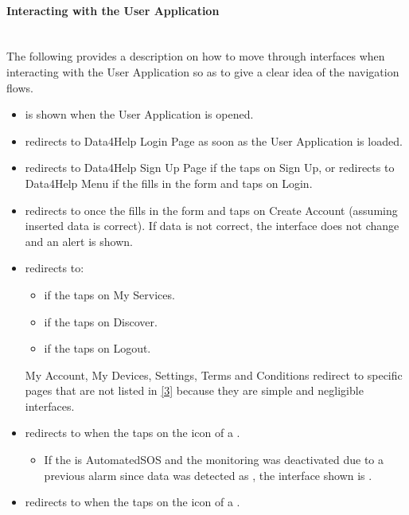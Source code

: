 \documentclass[../DD.tex]{subfiles}
\begin{document}
	\paragraph{Interacting with the User Application}\mbox{}\\
	\indent The following provides a description on how to move through interfaces when interacting with the User Application so as to give a clear idea of the navigation flows.
	\begin{itemize}
		\item {} is shown when the User Application is opened.
		\item {} redirects to Data4Help Login Page as soon as the User Application is loaded.
		\item {} redirects to Data4Help Sign Up Page if the  taps on Sign Up, or redirects to Data4Help Menu if the  fills in the form and taps on Login.
		\item {}redirects to  once the  fills in the form and taps on Create Account (assuming inserted data is correct). If data is not correct, the interface does not change and an alert is shown.
		\item {} redirects to:
			\begin{itemize}
				\item {} if the  taps on My Services.
				\item {} if the  taps on Discover.
				\item {} if the  taps on Logout.				
			\end{itemize}
			My Account, My Devices, Settings, Terms and Conditions redirect to specific pages that are not listed in \hyperref[ref:3]{[3]} because they are simple and negligible interfaces. 
		\item {} redirects to  when the  taps on the icon of a .
			\begin{itemize}
				\item If the  is AutomatedSOS and the monitoring was deactivated due to a previous alarm since data was detected as , the interface shown is .
			\end{itemize}
		\item {} redirects to  when the  taps on the icon of a .

\end{itemize}
\end{document}
